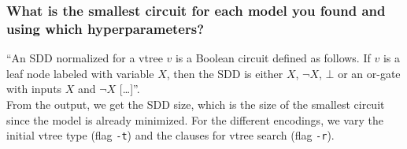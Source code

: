 \documentclass{article}
\begin{document}
\newpage

\subsubsection{What is the smallest circuit for each model you found and using which hyperparameters?}
``An SDD normalized for a vtree $v$ is a Boolean circuit defined as follows. If $v$ is a leaf node labeled with variable $X$, then the SDD is either $X$, $\neg X$, $\bot$ or an or-gate with inputs $X$ and $\neg X$ [\dots]''\cite{shen}.\\
From the output, we get the SDD size, which is the size of the smallest circuit since the model is already minimized.
For the different encodings, we vary the initial vtree type (flag \texttt{-t}) and the clauses for vtree search (flag \texttt{-r}).
\end{document}
